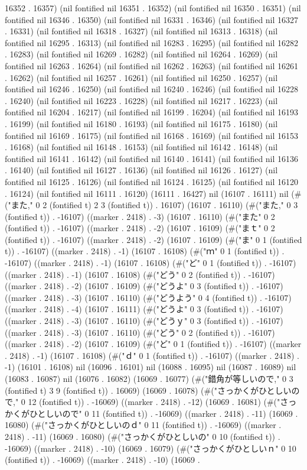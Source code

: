 16352 . 16357) (nil fontified nil 16351 . 16352) (nil fontified nil 16350 . 16351) (nil fontified nil 16346 . 16350) (nil fontified nil 16331 . 16346) (nil fontified nil 16327 . 16331) (nil fontified nil 16318 . 16327) (nil fontified nil 16313 . 16318) (nil fontified nil 16295 . 16313) (nil fontified nil 16283 . 16295) (nil fontified nil 16282 . 16283) (nil fontified nil 16269 . 16282) (nil fontified nil 16264 . 16269) (nil fontified nil 16263 . 16264) (nil fontified nil 16262 . 16263) (nil fontified nil 16261 . 16262) (nil fontified nil 16257 . 16261) (nil fontified nil 16250 . 16257) (nil fontified nil 16246 . 16250) (nil fontified nil 16240 . 16246) (nil fontified nil 16228 . 16240) (nil fontified nil 16223 . 16228) (nil fontified nil 16217 . 16223) (nil fontified nil 16204 . 16217) (nil fontified nil 16199 . 16204) (nil fontified nil 16193 . 16199) (nil fontified nil 16180 . 16193) (nil fontified nil 16175 . 16180) (nil fontified nil 16169 . 16175) (nil fontified nil 16168 . 16169) (nil fontified nil 16153 . 16168) (nil fontified nil 16148 . 16153) (nil fontified nil 16142 . 16148) (nil fontified nil 16141 . 16142) (nil fontified nil 16140 . 16141) (nil fontified nil 16136 . 16140) (nil fontified nil 16127 . 16136) (nil fontified nil 16126 . 16127) (nil fontified nil 16125 . 16126) (nil fontified nil 16124 . 16125) (nil fontified nil 16120 . 16124) (nil fontified nil 16111 . 16120) (16111 . 16427) nil (16107 . 16111) nil (#("また," 0 2 (fontified t) 2 3 (fontified t)) . 16107) (16107 . 16110) (#("また," 0 3 (fontified t)) . -16107) ((marker . 2418) . -3) (16107 . 16110) (#("また" 0 2 (fontified t)) . -16107) ((marker . 2418) . -2) (16107 . 16109) (#("まｔ" 0 2 (fontified t)) . -16107) ((marker . 2418) . -2) (16107 . 16109) (#("ま" 0 1 (fontified t)) . -16107) ((marker . 2418) . -1) (16107 . 16108) (#("ｍ" 0 1 (fontified t)) . -16107) ((marker . 2418) . -1) (16107 . 16108) (#("ど" 0 1 (fontified t)) . -16107) ((marker . 2418) . -1) (16107 . 16108) (#("どう" 0 2 (fontified t)) . -16107) ((marker . 2418) . -2) (16107 . 16109) (#("どうよ" 0 3 (fontified t)) . -16107) ((marker . 2418) . -3) (16107 . 16110) (#("どうよう" 0 4 (fontified t)) . -16107) ((marker . 2418) . -4) (16107 . 16111) (#("どうよ" 0 3 (fontified t)) . -16107) ((marker . 2418) . -3) (16107 . 16110) (#("どうｙ" 0 3 (fontified t)) . -16107) ((marker . 2418) . -3) (16107 . 16110) (#("どう" 0 2 (fontified t)) . -16107) ((marker . 2418) . -2) (16107 . 16109) (#("ど" 0 1 (fontified t)) . -16107) ((marker . 2418) . -1) (16107 . 16108) (#("ｄ" 0 1 (fontified t)) . -16107) ((marker . 2418) . -1) (16101 . 16108) nil (16096 . 16101) nil (16088 . 16095) nil (16087 . 16089) nil (16083 . 16087) nil (16076 . 16082) (16069 . 16077) (#("錯角が等しいので," 0 3 (fontified t) 3 9 (fontified t)) . 16069) (16069 . 16078) (#("さっかくがひとしいので," 0 12 (fontified t)) . -16069) ((marker . 2418) . -12) (16069 . 16081) (#("さっかくがひとしいので" 0 11 (fontified t)) . -16069) ((marker . 2418) . -11) (16069 . 16080) (#("さっかくがひとしいのｄ" 0 11 (fontified t)) . -16069) ((marker . 2418) . -11) (16069 . 16080) (#("さっかくがひとしいの" 0 10 (fontified t)) . -16069) ((marker . 2418) . -10) (16069 . 16079) (#("さっかくがひとしいｎ" 0 10 (fontified t)) . -16069) ((marker . 2418) . -10) (16069 . 
